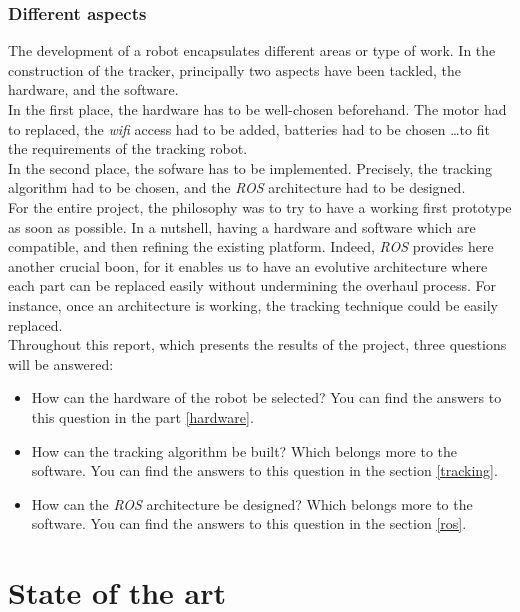 		\subsection{Different aspects}

		The development of a robot encapsulates different areas or type of work.
		In the construction of the tracker, principally two aspects 
		have been tackled, the hardware, and the software.
		\\\indent In the first place, the hardware has to be well-chosen beforehand.
		The motor had to replaced, the \textit{wifi} access had to be added, batteries 
		had to be chosen \dots to fit the requirements of the tracking robot.
		\\\indent In the second place, the sofware has to be implemented. Precisely, 
		the tracking algorithm had to be chosen, and the \textit{ROS} architecture had 
		to be designed.
		\\\indent For the entire project, the philosophy was to try to have 
		a working first prototype as soon as possible. In a nutshell, 
		having a hardware and software which are compatible, and then refining
		the existing platform. Indeed, \textit{ROS} provides here another
		crucial boon, for it enables us to have an evolutive architecture 
		where each part can be replaced easily without 
		undermining the overhaul process. For instance, once 
		an architecture is working, the tracking technique could
		be easily replaced.
		\\\indent Throughout this report, which presents the 
		results of the project, three questions will be answered:
		\begin{itemize}
			\item[\textbullet] How can the hardware of the robot be selected?
			You can find the answers to 
			this question in the part \vref{hardware}.
			\item[\textbullet] How can the tracking algorithm be built? Which belongs 
			more to the software. You can find the answers to 
			this question in the section \vref{tracking}.
			\item[\textbullet] How can the \textit{ROS} architecture be designed? 
			Which belongs more to the software. You can find the answers to 
			this question in the section \vref{ros}.
		\end{itemize}
		
\chapter{State of the art}

